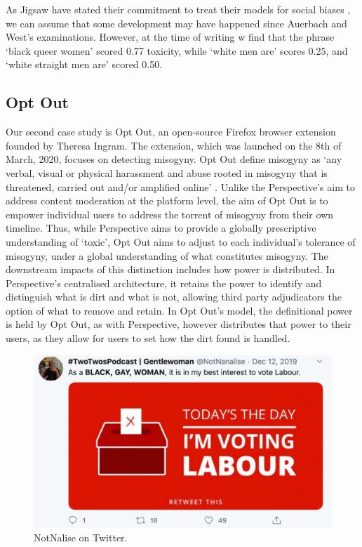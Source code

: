 As Jigsaw have stated their commitment to treat their models for social biases \cite{Marvin:2019}, we can assume that some development may have happened since Auerbach and West's examinations. However, at the time of writing w find that the phrase ‘black queer women’ scored 0.77 toxicity, while ‘white men are’ scores 0.25, and ‘white straight men are’ scored 0.50.

\subsection{Opt Out}\label{sub:optout}
Our second case study is Opt Out, an open-source Firefox browser extension founded by Theresa Ingram. The extension, which was launched on the 8th of March, 2020, focuses on detecting misogyny. Opt Out define misogyny as `any verbal, visual or physical harassment and abuse rooted in misogyny that is threatened, carried out and/or amplified online' \cite{Ingram:2020}. Unlike the Perspective's aim to address content moderation at the platform level, the aim of Opt Out is to empower individual users to address the torrent of misogyny from their own timeline. Thus, while Perspective aims to provide a globally prescriptive understanding of `toxic', Opt Out aims to adjust to each individual's tolerance of misogyny, under a global understanding of what constitutes misogyny. The downstream impacts of this distinction includes how power is distributed. In Perspective's centralised architecture, it retains the power to identify and distinguish what is dirt and what is not, allowing third party adjudicators the option of what to remove and retain. In Opt Out's model, the definitional power is held by Opt Out, as with Perspective, however distributes that power to their users, as they allow for users to set how the dirt found is handled.

\begin{figure}[!ht]
  \centering
  \includegraphics[scale=0.5]{Notnalise.png}
  \caption{NotNalise on Twitter.}
  \label{fig:notnalise}
\end{figure}

